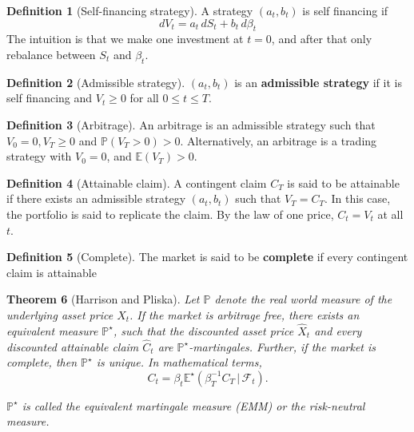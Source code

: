 \documentclass[10pt, oneside, reqno]{amsart}
\theoremstyle{plain}%
\newtheorem{thm}{Theorem}[section]
\theoremstyle{definition}
\newtheorem{defn}[thm]{Definition}
\theoremstyle{remark}
\newcommand{\given}{ \, | \,}
\renewcommand{\P}{\mathbb{P}}
\newcommand{\E}{\mathbb{E}}
\newcommand{\sigf}{\mathcal{F}}
\begin{document}
\begin{defn}[Self-financing strategy]
    A strategy $(a_t, b_t)$ is self financing if \[
        dV_t = a_t \, dS_t + b_t \, d\beta_t
    \]  The intuition is that we make one investment at $t = 0$, and after that only rebalance between $S_t$ and $\beta_t$.  
\end{defn}

\begin{defn}[Admissible strategy]
    $(a_t, b_t)$ is an \textbf{admissible strategy} if it is self financing and $V_t \geq 0$ for all $0 \leq t \leq T$.  
\end{defn}

\begin{defn}[Arbitrage]
    An arbitrage is an admissible strategy such that $V_0 = 0, V_T \geq 0$ and $\P(V_T > 0) > 0$.  Alternatively, an arbitrage is a trading strategy with $V_0 = 0$, and $\E(V_T) > 0$.
\end{defn}

\begin{defn}[Attainable claim]
    A contingent claim $C_T$ is said to be attainable if there exists an admissible strategy $(a_t, b_t)$ such that $V_T = C_T$.  In this case, the portfolio is said to replicate the claim.  By the law of one price, $C_t = V_t$ at all $t$.
\end{defn}

\begin{defn}[Complete]
    The market is said to be \textbf{complete} if every contingent claim is attainable
\end{defn}

\begin{thm}[Harrison and Pliska]
    Let $\P$ denote the real world measure of the underlying asset price $X_t$. If the market is arbitrage free, there exists an equivalent measure $\P^\star$, such that the discounted asset price $\hat X_t$ and every discounted attainable claim $\hat C_t$ are $\P^\star$-martingales.  Further, if the market is complete, then $\P^\star$ is unique.  In mathematical terms,\[
        C_t = \beta_t \E^\star(\beta_T^{-1} C_T \given \sigf_t).
    \] 
    
    $\P^\star$ is called the equivalent martingale measure (EMM) or the risk-neutral measure.  
\end{thm}

\end{document}
